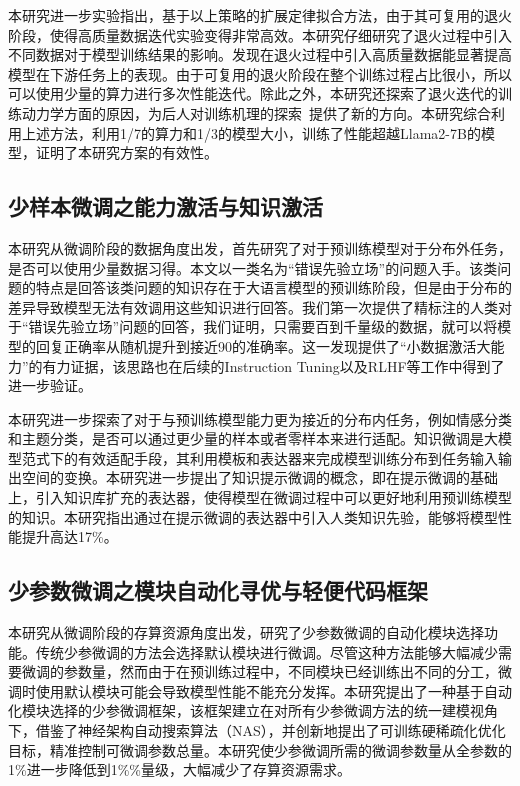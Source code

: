 本研究进一步实验指出，基于以上策略的扩展定律拟合方法，由于其可复用的退火阶段，使得高质量数据迭代实验变得非常高效。本研究仔细研究了退火过程中引入不同数据对于模型训练结果的影响。发现在退火过程中引入高质量数据能显著提高模型在下游任务上的表现。由于可复用的退火阶段在整个训练过程占比很小，所以可以使用少量的算力进行多次性能迭代。除此之外，本研究还探索了退火迭代的训练动力学方面的原因，为后人对训练机理的探索~\cite{wen2024understanding}提供了新的方向。本研究综合利用上述方法，利用1/7的算力和1/3的模型大小，训练了性能超越Llama2-7B的模型，证明了本研究方案的有效性。

\subsection{少样本微调之能力激活与知识激活}
本研究从微调阶段的数据角度出发，首先研究了对于预训练模型对于分布外任务，是否可以使用少量数据习得。本文以一类名为“错误先验立场”的问题入手。该类问题的特点是回答该类问题的知识存在于大语言模型的预训练阶段，但是由于分布的差异导致模型无法有效调用这些知识进行回答。我们第一次提供了精标注的人类对于“错误先验立场”问题的回答，我们证明，只需要百到千量级的数据，就可以将模型的回复正确率从随机提升到接近90的准确率。这一发现提供了“小数据激活大能力”的有力证据，该思路也在后续的Instruction Tuning以及RLHF等工作中得到了进一步验证。

本研究进一步探索了对于与预训练模型能力更为接近的分布内任务，例如情感分类和主题分类，是否可以通过更少量的样本或者零样本来进行适配。知识微调是大模型范式下的有效适配手段，其利用模板和表达器来完成模型训练分布到任务输入输出空间的变换。本研究进一步提出了知识提示微调的概念，即在提示微调的基础上，引入知识库扩充的表达器，使得模型在微调过程中可以更好地利用预训练模型的知识。本研究指出通过在提示微调的表达器中引入人类知识先验，能够将模型性能提升高达17\%。

\subsection{少参数微调之模块自动化寻优与轻便代码框架}
本研究从微调阶段的存算资源角度出发，研究了少参数微调的自动化模块选择功能。传统少参微调的方法会选择默认模块进行微调。尽管这种方法能够大幅减少需要微调的参数量，然而由于在预训练过程中，不同模块已经训练出不同的分工，微调时使用默认模块可能会导致模型性能不能充分发挥。本研究提出了一种基于自动化模块选择的少参微调框架，该框架建立在对所有少参微调方法的统一建模视角下，借鉴了神经架构自动搜索算法（NAS），并创新地提出了可训练硬稀疏化优化目标，精准控制可微调参数总量。本研究使少参微调所需的微调参数量从全参数的1\%进一步降低到1\%\%量级，大幅减少了存算资源需求。

